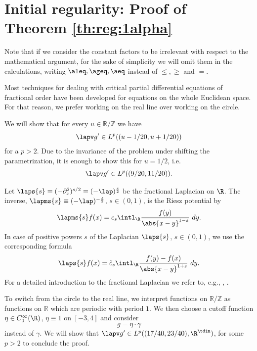 \section{Initial regularity: Proof of Theorem \ref{th:reg:1alpha}}\label{sec:initial}
Note that if we
consider the constant factors to be irrelevant with respect to the mathematical argument, for the sake of simplicity
we will omit them in the calculations, writing $\aleq , \ageq , \aeq$ instead of $\leq, \geq$ and $=$.

Most techniques for dealing with critical partial differential equations 
of fractional order have been developed for equations on the whole Euclidean space. For that reason, we
prefer working on the real line over working on the circle.

We will show that for every $u \in \mathbb R / \mathbb Z$ we have
\begin{equation*}
 \lapv g' \in L^{p} ((u-1/20,u+1/20))
\end{equation*}
for a $p>2$. Due to the invariance of the problem under shifting the parametrization, it is enough to show this 
for $u=1/2$, i.e.
\begin{equation} \label{eq:NeedToProveRegOnlyLocally}
 \lapv g' \in L^{p} ((9/20,11/20)).
\end{equation}

Let $\laps{s} \equiv (- \partial_x^2)^{s/2} \equiv (-\lap)^{\frac{s}{2}}$ be the fractional Laplacian on $\R$. The inverse, $\lapms{s} \equiv (-\lap)^{-\frac{s}{2}}$, $s \in (0,1)$, is the Riesz potential by
\begin{equation}\label{eq:fraclap-}
 \lapms{s} f(x) = c_s \intl_{\R} \frac{f(y)}{\abs{x-y}^{1-s}}\ dy.
\end{equation}
In case of positive powers $s$ of the Laplacian $\laps{s}$, $s\in(0,1)$, we use the corresponding formula
\begin{equation}\label{eq:fraclap+}
 \laps{s} f(x) = \tilde c_s \intl_{\R} \frac{f(y)-f(x)}{\abs{x-y}^{1+s}}\ dy.
\end{equation}
For a detailed introduction to the fractional Laplacian we refer to, e.g., \cite{DiNezza}, \cite[Section~2.5]{Schikorra-Doktor}.

To switch from the circle to the real line, we interpret
functions on $\mathbb R / \mathbb Z$ as functions on $\mathbb R$ which are periodic 
with period $1$. We then choose a cutoff function $\eta \in C_0^\infty(\R)$, 
$\eta \equiv 1$ on $[-3,4]$ and consider
\begin{equation}\label{eq:g=g}
  g = \eta \cdot \gamma
\end{equation}
instead of $\gamma$.
We will show that $\lapv g' \in L^p((17/40,23/40),\R^\tdim)$,
for some $p > 2$ to conclude the proof.

